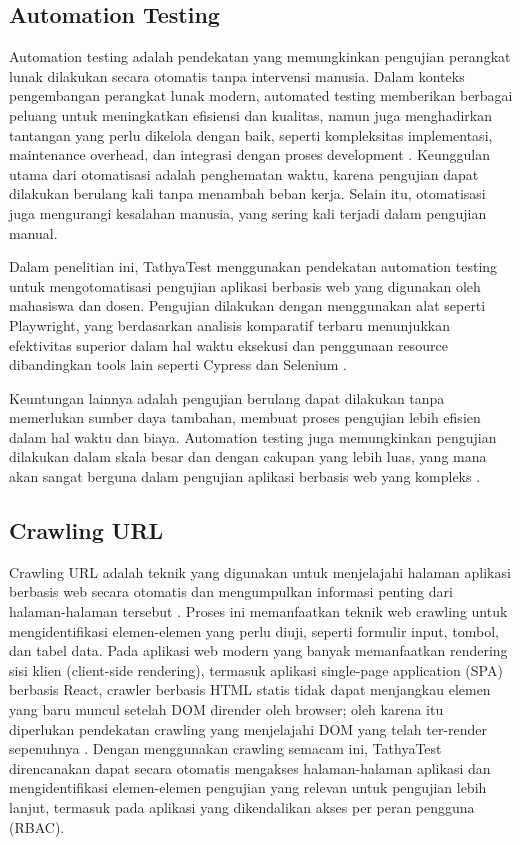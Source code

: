\subsection{Automation Testing}\label{automation-testing}

Automation testing adalah pendekatan yang memungkinkan pengujian perangkat lunak dilakukan secara otomatis tanpa intervensi manusia. Dalam konteks pengembangan perangkat lunak modern, automated testing memberikan berbagai peluang untuk meningkatkan efisiensi dan kualitas, namun juga menghadirkan tantangan yang perlu dikelola dengan baik, seperti kompleksitas implementasi, maintenance overhead, dan integrasi dengan proses development \parencite{solige2025automation}. Keunggulan utama dari otomatisasi adalah penghematan waktu, karena pengujian dapat dilakukan berulang kali tanpa menambah beban kerja. Selain itu, otomatisasi juga mengurangi kesalahan manusia, yang sering kali terjadi dalam pengujian manual.

Dalam penelitian ini, TathyaTest menggunakan pendekatan automation testing untuk mengotomatisasi pengujian aplikasi berbasis web yang digunakan oleh mahasiswa dan dosen. Pengujian dilakukan dengan menggunakan alat seperti Playwright, yang berdasarkan analisis komparatif terbaru menunjukkan efektivitas superior dalam hal waktu eksekusi dan penggunaan resource dibandingkan tools lain seperti Cypress dan Selenium \parencite{mon2025}.

Keuntungan lainnya adalah pengujian berulang dapat dilakukan tanpa memerlukan sumber daya tambahan, membuat proses pengujian lebih efisien dalam hal waktu dan biaya. Automation testing juga memungkinkan pengujian dilakukan dalam skala besar dan dengan cakupan yang lebih luas, yang mana akan sangat berguna dalam pengujian aplikasi berbasis web yang kompleks \parencite{shah2021}.

\subsection{Crawling URL}\label{crawling-url}

Crawling URL adalah teknik yang digunakan untuk menjelajahi halaman aplikasi berbasis web secara otomatis dan mengumpulkan informasi penting dari halaman-halaman tersebut \parencite{mishra2020}. Proses ini memanfaatkan teknik web crawling untuk mengidentifikasi elemen-elemen yang perlu diuji, seperti formulir input, tombol, dan tabel data. Pada aplikasi web modern yang banyak memanfaatkan rendering sisi klien (client-side rendering), termasuk aplikasi single-page application (SPA) berbasis React, crawler berbasis HTML statis tidak dapat menjangkau elemen yang baru muncul setelah DOM dirender oleh browser; oleh karena itu diperlukan pendekatan crawling yang menjelajahi DOM yang telah ter-render sepenuhnya \parencite{mesbah2012crawljax}. Dengan menggunakan crawling semacam ini, TathyaTest direncanakan dapat secara otomatis mengakses halaman-halaman aplikasi dan mengidentifikasi elemen-elemen pengujian yang relevan untuk pengujian lebih lanjut, termasuk pada aplikasi yang dikendalikan akses per peran pengguna (RBAC).

